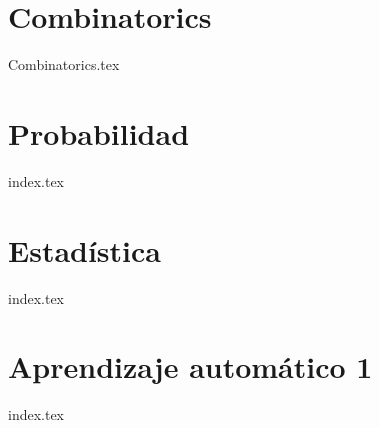 \chapter{Combinatorics}
{Combinatorics.tex}
\chapter{Probabilidad}
{index.tex}
\chapter{Estad\'istica}
{index.tex}
\chapter{Aprendizaje autom\'atico 1}
{index.tex}
